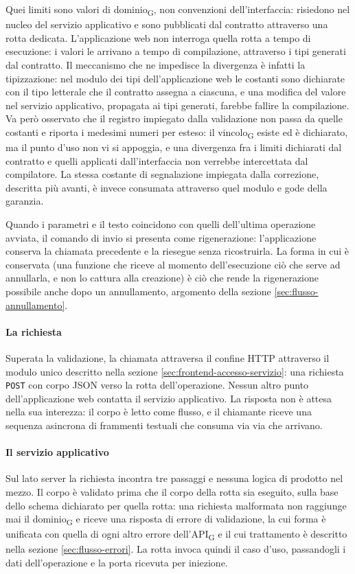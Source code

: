 \documentclass[a4paper, 10pt]{article}
\begin{document}
Quei limiti sono valori di dominio\textsubscript{G}, non convenzioni dell'interfaccia: risiedono nel nucleo del servizio applicativo e sono pubblicati dal contratto attraverso una rotta dedicata. L'applicazione web non interroga quella rotta a tempo di esecuzione: i valori le arrivano a tempo di compilazione, attraverso i tipi generati dal contratto. Il meccanismo che ne impedisce la divergenza è infatti la tipizzazione: nel modulo dei tipi dell'applicazione web le costanti sono dichiarate con il tipo letterale che il contratto assegna a ciascuna, e una modifica del valore nel servizio applicativo, propagata ai tipi generati, farebbe fallire la compilazione. Va però osservato che il registro impiegato dalla validazione non passa da quelle costanti e riporta i medesimi numeri per esteso: il vincolo\textsubscript{G} esiste ed è dichiarato, ma il punto d'uso non vi si appoggia, e una divergenza fra i limiti dichiarati dal contratto e quelli applicati dall'interfaccia non verrebbe intercettata dal compilatore. La stessa costante di segnalazione impiegata dalla correzione, descritta più avanti, è invece consumata attraverso quel modulo e gode della garanzia.

Quando i parametri e il testo coincidono con quelli dell'ultima operazione avviata, il comando di invio si presenta come rigenerazione: l'applicazione conserva la chiamata precedente e la riesegue senza ricostruirla. La forma in cui è conservata (una funzione che riceve al momento dell'esecuzione ciò che serve ad annullarla, e non lo cattura alla creazione) è ciò che rende la rigenerazione possibile anche dopo un annullamento, argomento della sezione \ref{sec:flusso-annullamento}.

\paragraph{La richiesta}
Superata la validazione, la chiamata attraversa il confine HTTP attraverso il modulo unico descritto nella sezione \ref{sec:frontend-accesso-servizio}: una richiesta \texttt{POST} con corpo JSON verso la rotta dell'operazione. Nessun altro punto dell'applicazione web contatta il servizio applicativo. La risposta non è attesa nella sua interezza: il corpo è letto come flusso, e il chiamante riceve una sequenza asincrona di frammenti testuali che consuma via via che arrivano.

\paragraph{Il servizio applicativo}
Sul lato server la richiesta incontra tre passaggi e nessuna logica di prodotto nel mezzo. Il corpo è validato prima che il corpo della rotta sia eseguito, sulla base dello schema dichiarato per quella rotta: una richiesta malformata non raggiunge mai il dominio\textsubscript{G} e riceve una risposta di errore di validazione, la cui forma è unificata con quella di ogni altro errore dell'API\textsubscript{G} e il cui trattamento è descritto nella sezione \ref{sec:flusso-errori}. La rotta invoca quindi il caso d'uso, passandogli i dati dell'operazione e la porta ricevuta per iniezione.
\end{document}
